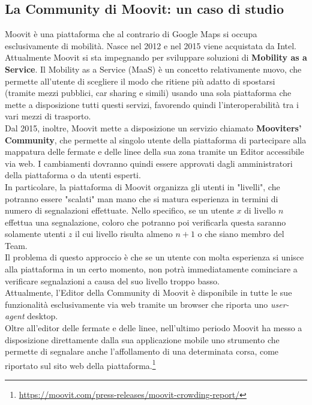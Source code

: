     \subsection{La Community di Moovit: un caso di studio}
        Moovit è una piattaforma che al contrario di Google Maps si occupa esclusivamente di mobilità.
        Nasce nel 2012 e nel 2015 viene acquistata da Intel. Attualmente Moovit si sta impegnando per sviluppare soluzioni di \textbf{Mobility as a Service}.
        Il Mobility as a Service (MaaS) è un concetto relativamente nuovo, che permette all'utente di scegliere il modo che ritiene più adatto di spostarsi (tramite mezzi pubblici, car sharing e simili) usando una sola piattaforma che mette a disposizione tutti questi servizi, favorendo quindi l'interoperabilità tra i vari mezzi di trasporto. \\

        Dal 2015, inoltre, Moovit mette a disposizione un servizio chiamato \textbf{Mooviters' Community}, che permette al singolo utente della piattaforma di partecipare alla mappatura delle fermate e delle linee della sua zona tramite un Editor accessibile via web. I cambiamenti dovranno quindi essere approvati dagli amministratori della piattaforma o da utenti esperti. \\

        In particolare, la piattaforma di Moovit organizza gli utenti in "livelli", che potranno essere "scalati" man mano che si matura esperienza in termini di numero di segnalazioni effettuate. Nello specifico, se un utente $x$ di livello $n$ effettua una segnalazione, coloro che potranno poi verificarla questa saranno solamente utenti $z$ il cui livello risulta almeno $n + 1$ o che siano membro del Team. \\
        Il problema di questo approccio è che se un utente con molta esperienza si unisce alla piattaforma in un certo momento, non potrà immediatamente cominciare a verificare segnalazioni a causa del suo livello troppo basso.\\
        Attualmente, l'Editor della Community di Moovit è disponibile in tutte le sue funzionalità esclusivamente via web tramite un browser che riporta uno \textit{user-agent} desktop. \\

        Oltre all'editor delle fermate e delle linee, nell'ultimo periodo Moovit ha messo a disposizione direttamente dalla sua applicazione mobile uno strumento che permette di segnalare anche l'affollamento di una determinata corsa, come riportato sul sito web della piattaforma.\footnote[4]{\url{https://moovit.com/press-releases/moovit-crowding-report/}}

